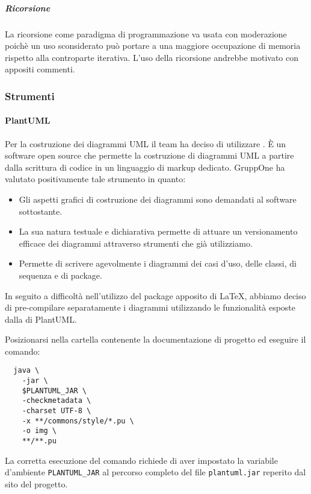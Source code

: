 \documentclass[../../norme-di-progetto.tex]{subfiles}
\begin{document}
\subparagraph{Ricorsione}%
\label{subp:ricorsione}
La ricorsione come paradigma di programmazione va usata con moderazione poichè un uso sconsiderato può portare a una maggiore occupazione di memoria rispetto alla controparte iterativa.
L'uso della ricorsione andrebbe motivato con appositi commenti.
\subsubsection{Strumenti}%
\label{subs:strumenti}

\paragraph{PlantUML}%
\label{par:plantuml}
Per la costruzione dei diagrammi UML il team ha deciso di utilizzare \@.
È un software open source che permette la costruzione di diagrammi UML a partire dalla scrittura di codice in un linguaggio di markup dedicato. GruppOne ha valutato positivamente tale strumento in quanto:

\begin{itemize}
  \item Gli aspetti grafici di costruzione dei diagrammi sono demandati al software sottostante.
  \item La sua natura testuale e dichiarativa permette di attuare un versionamento efficace dei diagrammi attraverso strumenti che già utilizziamo.
  \item Permette di scrivere agevolmente i diagrammi dei casi d'uso, delle classi, di sequenza e di package.
\end{itemize}

In seguito a difficoltà nell'utilizzo del package apposito di \LaTeX{}, abbiamo deciso di pre-compilare separatamente i diagrammi utilizzando le funzionalità esposte dalla  di PlantUML\@.

Posizionarsi nella cartella contenente la documentazione di progetto ed eseguire il comando:

\begin{verbatim}
  java \
    -jar \
    $PLANTUML_JAR \
    -checkmetadata \
    -charset UTF-8 \
    -x **/commons/style/*.pu \
    -o img \
    **/**.pu
\end{verbatim}

La corretta esecuzione del comando richiede di aver impostato la variabile d'ambiente \verb|PLANTUML_JAR| al percorso completo del file \verb|plantuml.jar| reperito dal sito del progetto.
\end{document}
